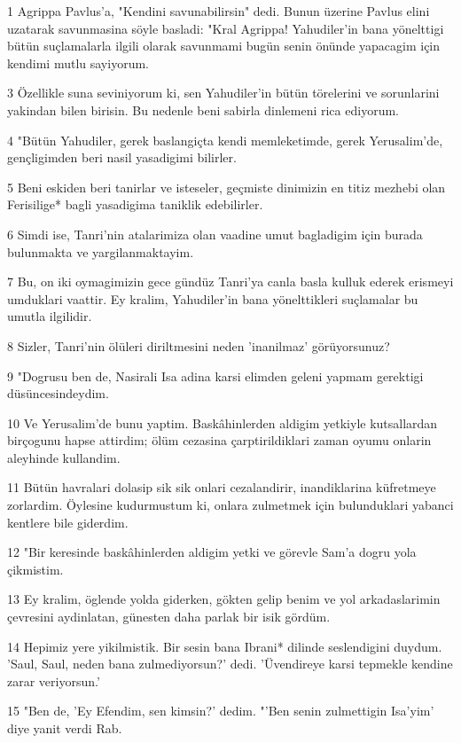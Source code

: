 \par 1 Agrippa Pavlus'a, "Kendini savunabilirsin" dedi. Bunun üzerine Pavlus elini uzatarak savunmasina söyle basladi: "Kral Agrippa! Yahudiler'in bana yönelttigi bütün suçlamalarla ilgili olarak savunmami bugün senin önünde yapacagim için kendimi mutlu sayiyorum.
\par 3 Özellikle suna seviniyorum ki, sen Yahudiler'in bütün törelerini ve sorunlarini yakindan bilen birisin. Bu nedenle beni sabirla dinlemeni rica ediyorum.
\par 4 "Bütün Yahudiler, gerek baslangiçta kendi memleketimde, gerek Yerusalim'de, gençligimden beri nasil yasadigimi bilirler.
\par 5 Beni eskiden beri tanirlar ve isteseler, geçmiste dinimizin en titiz mezhebi olan Ferisilige* bagli yasadigima taniklik edebilirler.
\par 6 Simdi ise, Tanri'nin atalarimiza olan vaadine umut bagladigim için burada bulunmakta ve yargilanmaktayim.
\par 7 Bu, on iki oymagimizin gece gündüz Tanri'ya canla basla kulluk ederek erismeyi umduklari vaattir. Ey kralim, Yahudiler'in bana yönelttikleri suçlamalar bu umutla ilgilidir.
\par 8 Sizler, Tanri'nin ölüleri diriltmesini neden 'inanilmaz' görüyorsunuz?
\par 9 "Dogrusu ben de, Nasirali Isa adina karsi elimden geleni yapmam gerektigi düsüncesindeydim.
\par 10 Ve Yerusalim'de bunu yaptim. Baskâhinlerden aldigim yetkiyle kutsallardan birçogunu hapse attirdim; ölüm cezasina çarptirildiklari zaman oyumu onlarin aleyhinde kullandim.
\par 11 Bütün havralari dolasip sik sik onlari cezalandirir, inandiklarina küfretmeye zorlardim. Öylesine kudurmustum ki, onlara zulmetmek için bulunduklari yabanci kentlere bile giderdim.
\par 12 "Bir keresinde baskâhinlerden aldigim yetki ve görevle Sam'a dogru yola çikmistim.
\par 13 Ey kralim, öglende yolda giderken, gökten gelip benim ve yol arkadaslarimin çevresini aydinlatan, günesten daha parlak bir isik gördüm.
\par 14 Hepimiz yere yikilmistik. Bir sesin bana Ibrani* dilinde seslendigini duydum. 'Saul, Saul, neden bana zulmediyorsun?' dedi. 'Üvendireye karsi tepmekle kendine zarar veriyorsun.'
\par 15 "Ben de, 'Ey Efendim, sen kimsin?' dedim. "'Ben senin zulmettigin Isa'yim' diye yanit verdi Rab.
